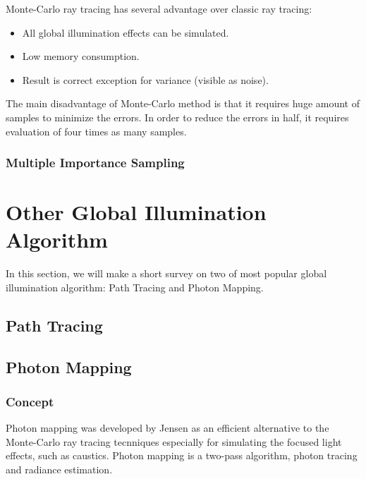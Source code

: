 Monte-Carlo ray tracing has several advantage over classic ray tracing: 

\begin{itemize} 

\item All global illumination effects can be simulated.

\item Low memory consumption. 

\item Result is correct exception for variance (visible as noise). 

\end{itemize} 

The main disadvantage of Monte-Carlo method is that it requires huge amount of samples to minimize the errors. In order to reduce the errors in half, it requires evaluation of four times as many samples. 

\subsubsection{Multiple Importance Sampling} 


\section{Other Global Illumination Algorithm}  
 
In this section, we will make a short survey on two of most popular global illumination algorithm: Path Tracing and Photon Mapping. 

\subsection{Path Tracing}


\subsection{Photon Mapping}

\subsubsection{Concept} 

Photon mapping was developed by Jensen \cite{HenrikWannJensen2004} as an efficient alternative to the Monte-Carlo ray tracing tecnniques especially for simulating the focused light effects, such as caustics. Photon mapping is a two-pass algorithm, photon tracing and radiance estimation. 

